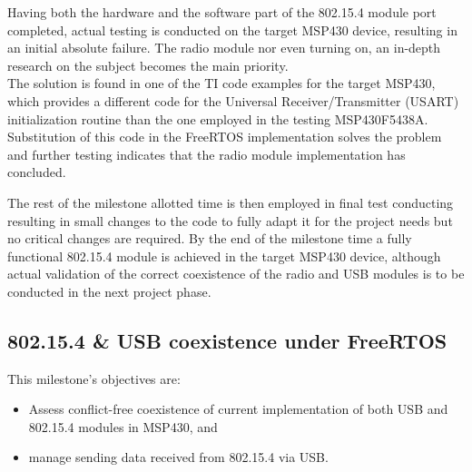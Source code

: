 \begin{enumerate}
		Having both the hardware and the software part of the 802.15.4 module port completed, actual testing is conducted on the target MSP430 device, resulting in an initial absolute failure. The radio module nor even turning on, an in-depth research on the subject becomes the main priority.\\

		The solution is found in one of the TI code examples for the target MSP430, which provides a different code for the Universal Receiver/Transmitter (USART) initialization routine than the one employed in the testing MSP430F5438A. Substitution of this code in the FreeRTOS implementation solves the problem and further testing indicates that the radio module implementation has concluded.\\

		\end{enumerate}

		The rest of the milestone allotted time is then employed in final test conducting resulting in small changes to the code to fully adapt it for the project needs but no critical changes are required. By the end of the milestone time a fully functional 802.15.4 module is achieved in the target MSP430 device, although actual validation of the correct coexistence of the radio and USB modules is to be conducted in the next project phase.\\


		\subsection{802.15.4 \& USB coexistence under FreeRTOS}
		\label{ssec:802.15.4.USB.FreeRTOS}	
		This milestone's objectives are:
		\begin{itemize}
		\item Assess conflict-free coexistence of current implementation of both USB and 802.15.4 modules in MSP430, and
		\item manage sending data received from 802.15.4 via USB.
		\end{itemize}
		
